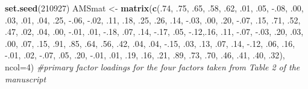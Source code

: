 \documentclass[
  english,
]{book}
\newenvironment{Shaded}{\begin{snugshade}}{\end{snugshade}}
\newcommand{\CommentTok}[1]{\textcolor[rgb]{0.56,0.35,0.01}{\textit{#1}}}
\newcommand{\DataTypeTok}[1]{\textcolor[rgb]{0.13,0.29,0.53}{#1}}
\newcommand{\DecValTok}[1]{\textcolor[rgb]{0.00,0.00,0.81}{#1}}
\newcommand{\FloatTok}[1]{\textcolor[rgb]{0.00,0.00,0.81}{#1}}
\newcommand{\KeywordTok}[1]{\textcolor[rgb]{0.13,0.29,0.53}{\textbf{#1}}}
\newcommand{\NormalTok}[1]{#1}
\newcommand{\StringTok}[1]{\textcolor[rgb]{0.31,0.60,0.02}{#1}}
\begin{document}
\begin{Shaded}
\begin{Highlighting}[]
\KeywordTok{set.seed}\NormalTok{(}\DecValTok{210927}\NormalTok{)}
\NormalTok{AMSmat <-}\StringTok{ }\KeywordTok{matrix}\NormalTok{(}\KeywordTok{c}\NormalTok{(.}\DecValTok{74}\NormalTok{, }\FloatTok{.75}\NormalTok{, }\FloatTok{.65}\NormalTok{, }\FloatTok{.58}\NormalTok{, }\FloatTok{.62}\NormalTok{, }\FloatTok{.01}\NormalTok{, }\FloatTok{.05}\NormalTok{, }\FloatTok{-.08}\NormalTok{, }\FloatTok{.00}\NormalTok{, }\FloatTok{.03}\NormalTok{, }\FloatTok{.01}\NormalTok{, }\FloatTok{.04}\NormalTok{, }\FloatTok{.25}\NormalTok{, }\FloatTok{-.06}\NormalTok{, }\FloatTok{-.02}\NormalTok{, }\FloatTok{.11}\NormalTok{, }\FloatTok{.18}\NormalTok{, }\FloatTok{.25}\NormalTok{, }\FloatTok{.26}\NormalTok{, }\FloatTok{.14}\NormalTok{,}
                   \FloatTok{-.03}\NormalTok{, }\FloatTok{.00}\NormalTok{, }\FloatTok{.20}\NormalTok{, }\FloatTok{-.07}\NormalTok{, }\FloatTok{.15}\NormalTok{, }\FloatTok{.71}\NormalTok{, }\FloatTok{.52}\NormalTok{, }\FloatTok{.47}\NormalTok{, }\FloatTok{.02}\NormalTok{, }\FloatTok{.04}\NormalTok{, }\FloatTok{.00}\NormalTok{, }\FloatTok{-.01}\NormalTok{, }\FloatTok{.01}\NormalTok{, }\FloatTok{-.18}\NormalTok{, }\FloatTok{.07}\NormalTok{, }\FloatTok{.14}\NormalTok{, }\FloatTok{-.17}\NormalTok{, }\FloatTok{.05}\NormalTok{, }\FloatTok{-.12}\NormalTok{,.}\DecValTok{16}\NormalTok{,}
                   \FloatTok{.11}\NormalTok{, }\FloatTok{-.07}\NormalTok{, }\FloatTok{-.03}\NormalTok{, }\FloatTok{.20}\NormalTok{, }\FloatTok{.03}\NormalTok{, }\FloatTok{.00}\NormalTok{, }\FloatTok{.07}\NormalTok{, }\FloatTok{.15}\NormalTok{, }\FloatTok{.91}\NormalTok{, }\FloatTok{.85}\NormalTok{, }\FloatTok{.64}\NormalTok{, }\FloatTok{.56}\NormalTok{, }\FloatTok{.42}\NormalTok{, }\FloatTok{.04}\NormalTok{, }\FloatTok{.04}\NormalTok{, }\FloatTok{-.15}\NormalTok{, }\FloatTok{.03}\NormalTok{, }\FloatTok{.13}\NormalTok{, }\FloatTok{.07}\NormalTok{, }\FloatTok{.14}\NormalTok{,}
                   \FloatTok{-.12}\NormalTok{, }\FloatTok{.06}\NormalTok{, }\FloatTok{.16}\NormalTok{, }\FloatTok{-.01}\NormalTok{, }\FloatTok{.02}\NormalTok{, }\FloatTok{-.07}\NormalTok{, }\FloatTok{.05}\NormalTok{, }\FloatTok{.20}\NormalTok{, }\FloatTok{-.01}\NormalTok{, }\FloatTok{.01}\NormalTok{, }\FloatTok{.19}\NormalTok{, }\FloatTok{.16}\NormalTok{, }\FloatTok{.21}\NormalTok{, }\FloatTok{.89}\NormalTok{, }\FloatTok{.73}\NormalTok{, }\FloatTok{.70}\NormalTok{, }\FloatTok{.46}\NormalTok{, }\FloatTok{.41}\NormalTok{, }\FloatTok{.40}\NormalTok{, }\FloatTok{.32}\NormalTok{), }\DataTypeTok{ncol=}\DecValTok{4}\NormalTok{) }\CommentTok{#primary factor loadings for the four factors taken from Table 2 of the manuscript}

\end{Highlighting}
\end{Shaded}
\end{document}
